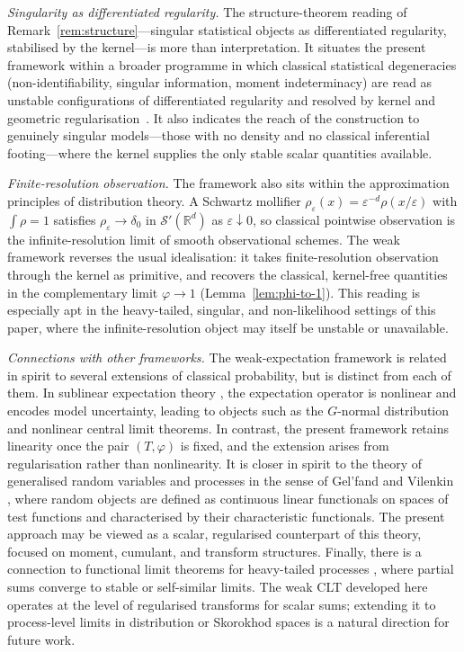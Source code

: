 \documentclass[12pt]{article}
\theoremstyle{definition}
\newcommand{\R}{\mathbb{R}}
\begin{document}
\medskip

\emph{Singularity as differentiated regularity.}
The structure-theorem reading of Remark~\ref{rem:structure}---singular
statistical objects as differentiated regularity, stabilised by the
kernel---is more than interpretation.  It situates the present framework within
a broader programme in which classical statistical degeneracies
(non-identifiability, singular information, moment indeterminacy) are read as
unstable configurations of differentiated regularity and resolved by kernel and
geometric regularisation~\cite{LabouriauTransversality}.  It also indicates the
reach of the construction to genuinely singular models---those with no density
and no classical inferential footing---where the kernel supplies the only
stable scalar quantities available.

\medskip

\emph{Finite-resolution observation.}
The framework also sits within the approximation principles of distribution
theory.  A Schwartz mollifier
$\rho_\varepsilon(x)=\varepsilon^{-d}\rho(x/\varepsilon)$ with $\int\rho=1$
satisfies $\rho_\varepsilon\to\delta_0$ in $\mathcal{S}'(\R^d)$ as
$\varepsilon\downarrow0$, so classical pointwise observation is the
infinite-resolution limit of smooth observational schemes.  The weak framework
reverses the usual idealisation: it takes finite-resolution observation through
the kernel as primitive, and recovers the classical, kernel-free quantities in
the complementary limit $\varphi\to1$ (Lemma~\ref{lem:phi-to-1}).  This reading
is especially apt in the heavy-tailed, singular, and non-likelihood settings of
this paper, where the infinite-resolution object may itself be unstable or
unavailable.

\medskip

\emph{Connections with other frameworks.}
The weak-expectation framework is related in spirit to several extensions of
classical probability, but is distinct from each of them. In sublinear
expectation theory \cite{Peng2008}, the expectation operator is nonlinear
and encodes model uncertainty, leading to objects such as the $G$-normal
distribution and nonlinear central limit theorems. In contrast, the present
framework retains linearity once the pair $(T,\varphi)$ is fixed, and the
extension arises from regularisation rather than nonlinearity. It is closer
in spirit to the theory of generalised random variables and processes in the
sense of Gel'fand and Vilenkin \cite{Gelfand1964}, where random objects are
defined as continuous linear functionals on spaces of test functions and
characterised by their characteristic functionals. The present approach may
be viewed as a scalar, regularised counterpart of this theory, focused on
moment, cumulant, and transform structures. Finally, there is a connection
to functional limit theorems for heavy-tailed processes \cite{Resnick2007},
where partial sums converge to stable or self-similar limits. The weak CLT
developed here operates at the level of regularised transforms for scalar
sums; extending it to process-level limits in distribution or Skorokhod
spaces is a natural direction for future work.
\end{document}
